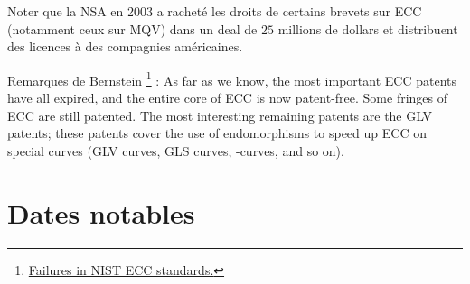 Noter que la NSA en 2003 a racheté les droits de certains brevets sur ECC (notamment ceux sur MQV) dans un deal de $25$ millions de dollars et distribuent des licences à des compagnies américaines.

Remarques de Bernstein \footnote{\href{https://cr.yp.to/newelliptic/nistecc-20160106.pdf}{Failures in NIST ECC standards.}} : As far as we know, the most important ECC patents have all expired, and the entire core of ECC is now patent-free. Some fringes of ECC are still patented. The most interesting remaining patents are the GLV patents; these patents cover the use of endomorphisms to speed up ECC on special curves (GLV curves, GLS curves, \Q-curves, and so on).



\section{Dates notables}
